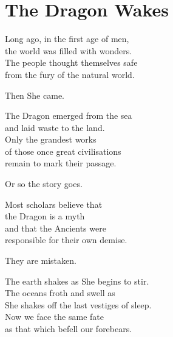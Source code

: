 \documentclass[12pt, a5paper, parskip=half-]{scrartcl}
\begin{document}


\setmainfont{URWClassico}
\normalsize


\center

\setcounter{page}{1}
\section*{\huge \phantom{a} \hfill The Dragon Wakes \hfill \phantom{a}} \label{section:the-dragon-wakes}
\bigskip
Long ago, in the first age of men,\\
the world was filled with wonders. \\
The people thought themselves safe \\
from the fury of the natural world.

\medskip

Then She came.

\medskip

The Dragon emerged from the sea\\and laid waste to the land.\\
Only the grandest works\\of those once great civilisations\\remain to mark their passage.

\medskip

Or so the story goes.

\medskip

Most scholars believe that\\the Dragon is a myth\\and that the Ancients were\\responsible for their own demise.

\medskip

They are mistaken. 

\medskip

The earth shakes as She begins to stir.\\
The oceans froth and swell as\\She shakes off the last vestiges of sleep.\\
Now we face the same fate\\as that which befell our forebears.
\vfill
\end{document}
